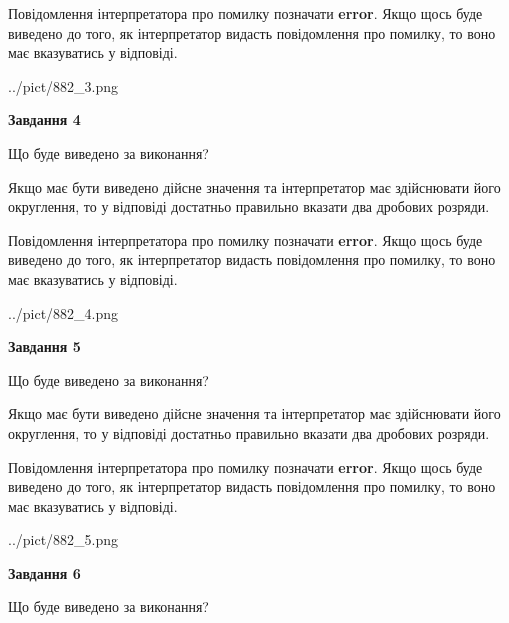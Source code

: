 \documentclass[12pt, ukrainian]{article}
\begin{document}
{\begin {Large}
Повідомлення інтерпретатора про помилку позначати \textbf{error}.
Якщо щось буде виведено до того, як інтерпретатор видасть повідомлення про помилку, 
то воно має вказуватись у відповіді. \par

\begin{center}
	{../pict/882_3.png}
\end{center}
\newpage

{\begin {center}\textbf{Завдання 4}\end {center}}\par
Що буде виведено за виконання? \par

Якщо має бути виведено дійсне значення та інтерпретатор має здійснювати його округлення, 
то у відповіді достатньо правильно вказати два дробових розряди.

Повідомлення інтерпретатора про помилку позначати \textbf{error}.
Якщо щось буде виведено до того, як інтерпретатор видасть повідомлення про помилку, 
то воно має вказуватись у відповіді. \par

\begin{center}
	{../pict/882_4.png}
\end{center}
\newpage

{\begin {center}\textbf{Завдання 5}\end {center}}\par
Що буде виведено за виконання? \par

Якщо має бути виведено дійсне значення та інтерпретатор має здійснювати його округлення, 
то у відповіді достатньо правильно вказати два дробових розряди.

Повідомлення інтерпретатора про помилку позначати \textbf{error}.
Якщо щось буде виведено до того, як інтерпретатор видасть повідомлення про помилку, 
то воно має вказуватись у відповіді. \par

\begin{center}
	{../pict/882_5.png}
\end{center}
\newpage

{\begin {center}\textbf{Завдання 6}\end {center}}\par
Що буде виведено за виконання? \par


\end{Large}}
\end{document}
